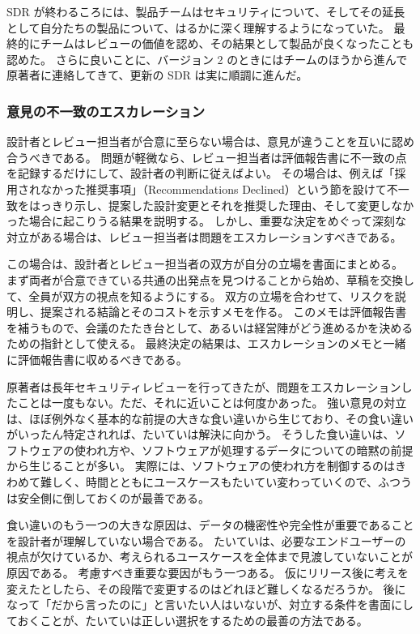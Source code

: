 \documentclass[uplatex]{jsarticle}
\begin{document}
SDR が終わるころには、製品チームはセキュリティについて、そしてその延長として自分たちの製品について、はるかに深く理解するようになっていた。
最終的にチームはレビューの価値を認め、その結果として製品が良くなったことも認めた。
さらに良いことに、バージョン 2 のときにはチームのほうから進んで原著者に連絡してきて、更新の SDR は実に順調に進んだ。

\subsubsection{意見の不一致のエスカレーション}

設計者とレビュー担当者が合意に至らない場合は、意見が違うことを互いに認め合うべきである。
問題が軽微なら、レビュー担当者は評価報告書に不一致の点を記録するだけにして、設計者の判断に従えばよい。
その場合は、例えば「採用されなかった推奨事項」（Recommendations Declined）という節を設けて不一致をはっきり示し、提案した設計変更とそれを推奨した理由、そして変更しなかった場合に起こりうる結果を説明する。
しかし、重要な決定をめぐって深刻な対立がある場合は、レビュー担当者は問題をエスカレーションすべきである。

この場合は、設計者とレビュー担当者の双方が自分の立場を書面にまとめる。
まず両者が合意できている共通の出発点を見つけることから始め、草稿を交換して、全員が双方の視点を知るようにする。
双方の立場を合わせて、リスクを説明し、提案される結論とそのコストを示すメモを作る。
このメモは評価報告書を補うもので、会議のたたき台として、あるいは経営陣がどう進めるかを決めるための指針として使える。
最終決定の結果は、エスカレーションのメモと一緒に評価報告書に収めるべきである。

原著者は長年セキュリティレビューを行ってきたが、問題をエスカレーションしたことは一度もない。ただ、それに近いことは何度かあった。
強い意見の対立は、ほぼ例外なく基本的な前提の大きな食い違いから生じており、その食い違いがいったん特定されれば、たいていは解決に向かう。
そうした食い違いは、ソフトウェアの使われ方や、ソフトウェアが処理するデータについての暗黙の前提から生じることが多い。
実際には、ソフトウェアの使われ方を制御するのはきわめて難しく、時間とともにユースケースもたいてい変わっていくので、ふつうは安全側に倒しておくのが最善である。

食い違いのもう一つの大きな原因は、データの機密性や完全性が重要であることを設計者が理解していない場合である。
たいていは、必要なエンドユーザーの視点が欠けているか、考えられるユースケースを全体まで見渡していないことが原因である。
考慮すべき重要な要因がもう一つある。
仮にリリース後に考えを変えたとしたら、その段階で変更するのはどれほど難しくなるだろうか。
後になって「だから言ったのに」と言いたい人はいないが、対立する条件を書面にしておくことが、たいていは正しい選択をするための最善の方法である。
\end{document}

